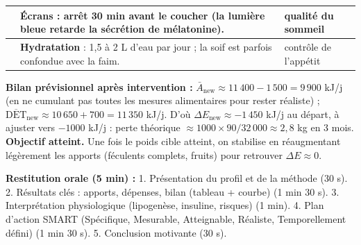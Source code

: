 \documentclass[11pt]{article}
\begin{document}
\begin{exoresolu}
\begin{center}
\begin{tabularx}{\linewidth}{|l|X|X|}
& \textbf{Écrans} : arrêt 30 min avant le coucher (la lumière bleue retarde la sécrétion de mélatonine). & qualité du sommeil \\ \hline
& \textbf{Hydratation} : 1,5 à 2 L d'eau par jour ; la soif est parfois confondue avec la faim. & contrôle de l'appétit \\ \hline
\end{tabularx}
\end{center}
\par
\textbf{Bilan prévisionnel après intervention :} $\bar{A}_{\text{new}} \approx 11\,400 - 1\,500 = 9\,900$ kJ/j (en ne cumulant pas toutes les mesures alimentaires pour rester réaliste) ; $\overline{\text{DET}}_{\text{new}} \approx 10\,650 + 700 = 11\,350$ kJ/j. D'où $\Delta E_{\text{new}} \approx -1\,450$ kJ/j au départ, à ajuster vers $-1000$ kJ/j : perte théorique $\approx 1000 \times 90 / 32\,000 \approx 2,8$ kg en 3 mois. \textbf{Objectif atteint.} Une fois le poids cible atteint, on stabilise en réaugmentant légèrement les apports (féculents complets, fruits) pour retrouver $\Delta E \approx 0$.
\par
\textbf{Restitution orale (5 min) :}
1. Présentation du profil et de la méthode (30 s).
2. Résultats clés : apports, dépenses, bilan (tableau + courbe) (1 min 30 s).
3. Interprétation physiologique (lipogenèse, insuline, risques) (1 min).
4. Plan d'action SMART (Spécifique, Mesurable, Atteignable, Réaliste, Temporellement défini) (1 min 30 s).
5. Conclusion motivante (30 s).
\end{exoresolu}
\end{document}
